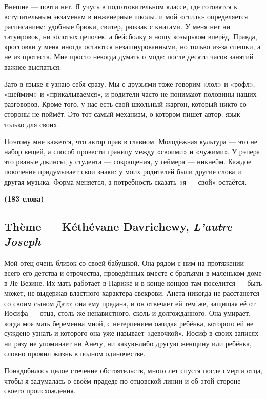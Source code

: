 \documentclass[11pt,a4paper]{article}
\begin{document}
Внешне --- почти нет. Я учусь в подготовительном классе, где готовятся к вступительным экзаменам в инженерные школы, и мой «стиль» определяется расписанием: удобные брюки, свитер, рюкзак с книгами. У меня нет ни татуировок, ни золотых цепочек, а бейсболку я ношу козырьком вперёд. Правда, кроссовки у меня иногда остаются незашнурованными, но только из-за спешки, а не из протеста. Мне просто некогда думать о моде: после десяти часов занятий важнее выспаться.

Зато в языке я узнаю себя сразу. Мы с друзьями тоже говорим «лол» и «рофл», «шеймим» и «прикалываемся», и родители часто не понимают половины наших разговоров. Кроме того, у нас есть свой школьный жаргон, который никто со стороны не поймёт. Это тот самый механизм, о котором пишет автор: язык только для своих.

Поэтому мне кажется, что автор прав в главном. Молодёжная культура --- это не набор вещей, а способ провести границу между «своими» и «чужими». У рэпера это рваные джинсы, у студента --- сокращения, у геймера --- никнейм. Каждое поколение придумывает свои знаки: у моих родителей были другие слова и другая музыка. Форма меняется, а потребность сказать «я --- свой» остаётся.

\textbf{(183 слова)}

\hypertarget{thuxe8me-kuxe9thuxe9vane-davrichewy-lautre-joseph}{%
\subsection{\texorpdfstring{Thème --- Kéthévane Davrichewy, \emph{L'autre Joseph}}{Thème --- Kéthévane Davrichewy, L'autre Joseph}}\label{thuxe8me-kuxe9thuxe9vane-davrichewy-lautre-joseph}}

Мой отец очень близок со своей бабушкой. Она рядом с ним на протяжении всего его детства и отрочества, проведённых вместе с братьями в маленьком доме в Ле-Везине. Их мать работает в Париже и в конце концов там поселится --- быть может, не выдержав властного характера свекрови. Анета никогда не расстанется со своим сыном Дато; она ему предана, и он отвечает ей тем же, защищая её от Иосифа --- отца, столь же ненавистного, сколь и долгожданного. Она умирает, когда моя мать беременна мной, с нетерпением ожидая ребёнка, которого ей не суждено узнать и которого она уже называет «девочкой». Иосиф в своих записях ни разу не упоминает ни Анету, ни какую-либо другую женщину или ребёнка, словно прожил жизнь в полном одиночестве.

Понадобилось целое стечение обстоятельств, много лет спустя после смерти отца, чтобы я задумалась о своём прадеде по отцовской линии и об этой стороне своего происхождения.
\end{document}
